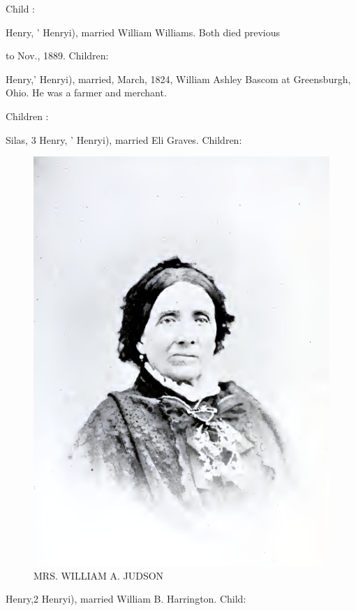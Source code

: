 \documentclass[oneside]{book}
\begin{document}
Child : 


Henry, ' Henryi), married William Williams. Both died previous 

to Nov., 1889. Children: 



Henry,' Henryi), married, March, 1824, William Ashley Bascom 
at Greensburgh, Ohio. He was a farmer and merchant. 

Children : 





Silas, 3 Henry, ' Henryi), married Eli Graves. Children: 



\begin{figure}[htp]
	\centering
	\includegraphics[scale=1]{../white/mrsWilliamAJudsonWhite.png}
	\caption {MRS. WILLIAM A. JUDSON}
\end{figure}





Henry,2 Henryi), married William B. Harrington. Child: 
\end{document}

